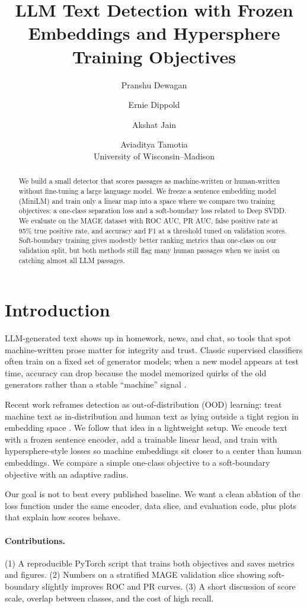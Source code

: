\documentclass[11pt]{article}
\title{LLM Text Detection with Frozen Embeddings and Hypersphere Training Objectives}
\author{Pranshu Dewagan \and Ernie Dippold \and Akshat Jain \and Aviaditya Tamotia \\
  University of Wisconsin--Madison}
\begin{document}
\maketitle
\begin{abstract}
We build a small detector that scores passages as machine-written or human-written without fine-tuning a large language model.
We freeze a sentence embedding model (MiniLM) and train only a linear map into a space where we compare two training objectives: a one-class separation loss and a soft-boundary loss related to Deep SVDD.
We evaluate on the MAGE dataset with ROC AUC, PR AUC, false positive rate at 95\% true positive rate, and accuracy and F1 at a threshold tuned on validation scores.
Soft-boundary training gives modestly better ranking metrics than one-class on our validation split, but both methods still flag many human passages when we insist on catching almost all LLM passages.
\end{abstract}

\section{Introduction}
LLM-generated text shows up in homework, news, and chat, so tools that spot machine-written prose matter for integrity and trust.
Classic supervised classifiers often train on a fixed set of generator models; when a new model appears at test time, accuracy can drop because the model memorized quirks of the old generators rather than a stable ``machine'' signal \citep{zeng2025human,ippolito2019automatic}.

Recent work reframes detection as out-of-distribution (OOD) learning: treat machine text as in-distribution and human text as lying outside a tight region in embedding space \citep{zeng2025human}.
We follow that idea in a lightweight setup.
We encode text with a frozen sentence encoder, add a trainable linear head, and train with hypersphere-style losses so machine embeddings sit closer to a center than human embeddings.
We compare a simple one-class objective to a soft-boundary objective with an adaptive radius.

Our goal is not to beat every published baseline.
We want a clean ablation of the loss function under the same encoder, data slice, and evaluation code, plus plots that explain how scores behave.

\paragraph{Contributions.}
(1) A reproducible PyTorch script that trains both objectives and saves metrics and figures.
(2) Numbers on a stratified MAGE validation slice showing soft-boundary slightly improves ROC and PR curves.
(3) A short discussion of score scale, overlap between classes, and the cost of high recall.
\end{document}
